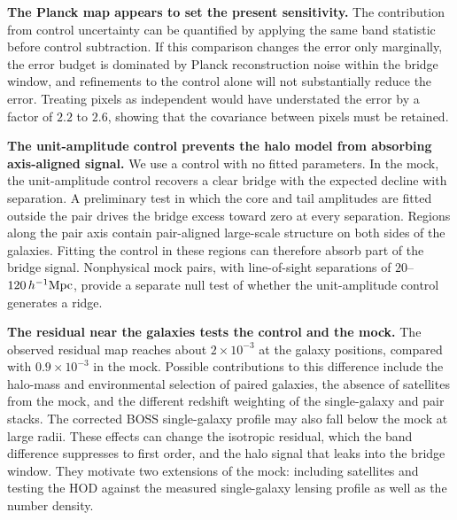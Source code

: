 \documentclass[preprint]{aastex701}
\newcommand{\hinvMpc}{h^{-1}{\rm Mpc}}
\begin{document}
\textbf{The Planck map appears to set the present sensitivity.} The
contribution from control uncertainty can be quantified by applying the same
band statistic before control subtraction.
If this comparison changes the error only marginally, the error budget is
dominated by Planck reconstruction noise within the bridge window, and
refinements to the control alone will not substantially reduce the error.
Treating pixels as independent would have understated
the error by a factor of $2.2$ to $2.6$, %
showing that the covariance between pixels must be retained.

\textbf{The unit-amplitude control prevents the halo model from absorbing
axis-aligned signal.}
We use a control with no fitted parameters. In the mock, the unit-amplitude
control recovers a clear bridge with the expected decline with separation. A
preliminary test in which the core and tail amplitudes are fitted outside the
pair drives the bridge excess toward zero at every separation.
Regions along the pair axis contain pair-aligned large-scale structure on both
sides of the galaxies. Fitting the control in these regions can therefore
absorb part of the bridge signal. Nonphysical mock pairs, with
line-of-sight separations of
$20$--$120\,\hinvMpc$, provide a separate null test of whether the
unit-amplitude control generates a ridge. %

\textbf{The residual near the galaxies tests the control and the mock.}
The observed residual map reaches about $2\times10^{-3}$ at the galaxy
positions, compared with $0.9\times10^{-3}$ in the mock. %
Possible contributions to this difference include the halo-mass and
environmental selection of paired galaxies, the absence of satellites from
the mock, and the different redshift weighting of the single-galaxy and pair
stacks. The corrected BOSS single-galaxy profile may also fall below the mock
at large radii. %
These effects can change the isotropic residual, which the band difference
suppresses to first order, and the halo signal that leaks
into the bridge window. They motivate two extensions of the mock: including
satellites and testing the HOD against the measured single-galaxy lensing
profile as well as the number density.
\end{document}
